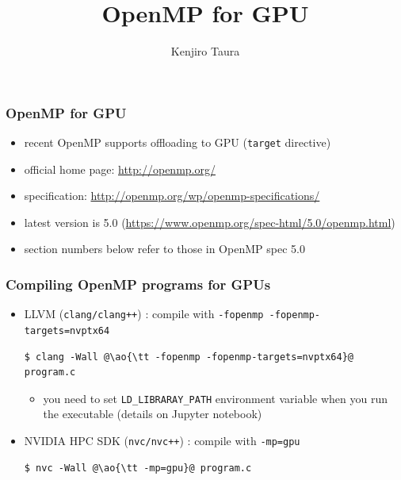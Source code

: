 \documentclass[12pt,dvipdfmx]{beamer}
\title{OpenMP for GPU}
\institute{}
\author{Kenjiro Taura}
\date{}
\newcommand{\ao}[1]{{\color{blue}#1}}
\begin{document}
\maketitle




\begin{frame}
\frametitle{OpenMP for GPU}
\begin{itemize}
\item recent OpenMP supports offloading to GPU ({\tt target} directive)
\item official home page:
  \url{http://openmp.org/}
\item specification:
  \url{http://openmp.org/wp/openmp-specifications/}
\item latest version is 5.0
(\url{https://www.openmp.org/spec-html/5.0/openmp.html})
\item section numbers below refer to those in OpenMP spec 5.0
\end{itemize}
\end{frame}

\begin{frame}[fragile]
\frametitle{Compiling OpenMP programs for GPUs}
\begin{itemize}
\item LLVM ({\tt clang/clang++}) : compile with {\tt -fopenmp -fopenmp-targets=nvptx64}
\begin{lstlisting}
$ clang -Wall @\ao{\tt -fopenmp -fopenmp-targets=nvptx64}@ program.c
\end{lstlisting}%
\begin{itemize}
\item you need to set {\tt LD\_LIBRARAY\_PATH} environment variable when you run the executable (details on Jupyter notebook)
\end{itemize}

\item NVIDIA HPC SDK ({\tt nvc/nvc++}) : compile with {\tt -mp=gpu}
\begin{lstlisting}
$ nvc -Wall @\ao{\tt -mp=gpu}@ program.c
\end{lstlisting}%
\end{itemize}
\end{frame}
\end{document}
